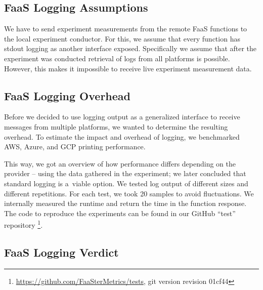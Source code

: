 \documentclass[../main.tex]{subfiles}
\begin{document}
\subsection{FaaS Logging Assumptions}%
\label{sub:designLoggingAssumptions}

We have to send experiment measurements from the remote FaaS functions to the local experiment conductor. 
For this, we assume that every function has stdout logging as another interface exposed. 
Specifically we assume that after the experiment was conducted retrieval of logs from all platforms is possible. 
However, this makes it impossible to receive live experiment measurement data.

\subsection{FaaS Logging Overhead}%
\label{sub:designLoggingOverhead}

Before we decided to use logging output as a generalized interface to receive messages from multiple platforms, 
we wanted to determine the resulting overhead.
To estimate the impact and overhead of logging, we benchmarked AWS, Azure, and GCP printing performance. 

This way, we got an overview of how performance differs depending on the provider -- using the data gathered 
in the experiment; we later concluded that standard logging is a~viable option.
We tested log output of different sizes and different repetitions. 
For each test, we took 20 samples to avoid fluctuations.
We internally measured the runtime and return the time in the function response. 
The code to reproduce the experiments can be found in our GitHub ``test'' repository%
\footnote{\url{https://github.com/FaaSterMetrics/tests}, git version revision 01cf44}.

\subsection{FaaS Logging Verdict}%
\label{sub:designLoggingResult}
\end{document}
